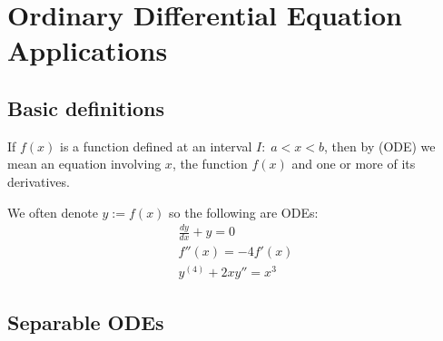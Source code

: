 \documentclass[a4paper]{article}
\begin{document}






\newpage
\tableofcontents
\newpage



\section{Ordinary Differential Equation Applications}

\subsection{Basic definitions}
\begin{definition}[ODE]
    If $f(x)$ is a function defined at an interval $I:\; a < x < b$, then by  (ODE) we mean an equation involving $x$, the function $f(x)$ and one or more of its derivatives.
\end{definition}
We often denote $y:=f(x)$ so the following are ODEs:
\begin{gather*}
\frac{dy}{dx} + y = 0 \\
f''(x) = -4f'(x) \\
y^{(4)} + 2x y'' = x^3
\end{gather*}




\subsection{Separable ODEs}
\end{document}
